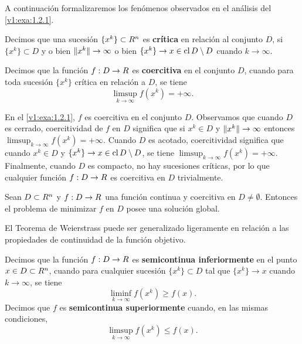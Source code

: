 A continuación formalizaremos los fenómenos observados en el análisis del \cref{v1:exa:1.2.1}.

\begin{definition}\label{v1:def:1.2.3}
    Decimos que una sucesión $\{x^k\} \subset R^n$ es \textbf{crítica} en relación al conjunto $D$, si $\{x^k\} \subset D$ y o bien $\lVert x^k\rVert \to \infty$ o bien $\{x^k\} \to x \in \operatorname{cl} D \setminus D$ cuando $k \to \infty$.

    Decimos que la función $f : D \to R$ es \textbf{coercitiva} en el conjunto $D$, cuando para toda sucesión $\{x^k\}$ crítica en relación a $D$, se tiene
    \[
        \limsup_{k \to \infty} f(x^k) = +\infty.
    \]
\end{definition}

En el \cref{v1:exa:1.2.1}, $f$ es coercitiva en el conjunto $D$. Observamos que cuando $D$ es cerrado, coercitividad de $f$ en $D$ significa que si $x^k \in D$ y $\lVert x^k\rVert \to \infty$ entonces $\limsup_{k \to \infty} f(x^k) = +\infty$. Cuando $D$ es acotado, coercitividad significa que cuando $x^k \in D$ y $\{x^k\} \to x \in \operatorname{cl} D \setminus D$, se tiene $\limsup_{k \to \infty} f(x^k) = +\infty$. Finalmente, cuando $D$ es compacto, no hay sucesiones críticas, por lo que cualquier función $f : D \to R$ es coercitiva en $D$ trivialmente.

\begin{corollary}\label{v1:cor:1.2.3}
    Sean $D \subset R^n$ y $f : D \to R$ una función continua y coercitiva en $D \neq \emptyset$. Entonces el problema de minimizar $f$ en $D$ posee una solución global.
\end{corollary}

El Teorema de Weierstrass puede ser generalizado ligeramente en relación a las propiedades de continuidad de la función objetivo.

\begin{definition}[Semicontinuidad]\label{v1:def:1.2.4}
    Decimos que la función $f : D \to R$ es \textbf{semicontinua inferiormente} en el punto $x \in D \subset R^n$, cuando para cualquier sucesión $\{x^k\} \subset D$ tal que $\{x^k\} \to x$ cuando $k \to \infty$, se tiene
    \begin{equation}
        \liminf_{k \to \infty} f(x^k) \ge f(x). \label{v1:eq:1.5}
    \end{equation}
    Decimos que $f$ es \textbf{semicontinua superiormente} cuando, en las mismas condiciones,
    \[
        \limsup_{k \to \infty} f(x^k) \le f(x).
    \]
\end{definition}

